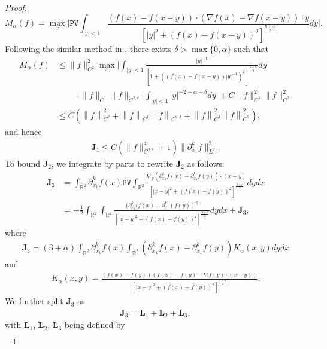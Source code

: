 \documentclass[reqno]{amsart}%
\theoremstyle{definition}
\theoremstyle{remark}
\numberwithin{equation}{section}
\newcommand{\0}{\mathbf{0}}
\newcommand{\1}{\mathbf{1}}
\newcommand{\R}{\mathbb R}
\newcommand{\PV}{\texttt{PV}}
\numberwithin{equation}{section}
\numberwithin{theorem}{section}
\numberwithin{figure}{section}
\begin{document}
\begin{proof}
\begin{equation}
M_\alpha(f) = \max_x\Big| \PV \int_{|y|<1}  \frac{\left(f(x)-f(x-y)\right)\cdot \left(\nabla f(x)-\nabla f(x-y)\right)\cdot y}{\left[ |y|^2 + \left(f(x) - f(x - y)\right)^2 \right]^{\frac{5 + \alpha}{2}}}dy\Big|.
\end{equation}
Following the similar method in \cite{CG07}, there exists $\delta>\max\{0,\alpha\}$ such that
\begin{align*}
M_\alpha(f)&\le \|f\|^2_{C^2}\max_{x}\Big|\int_{|y|<1}\frac{|y|^{-1}}{\left[ 1 + ((f(x) - f(x - y))|y|^{-1})^2 \right]^{\frac{5 + \alpha}{2}}}dy\Big|\\
&\qquad+\|f\|_{C^1}\|f\|_{C^{2,\delta}}\Big|\int_{|y|<1}|y|^{-2-\alpha+\delta}dy\Big|+C\|f\|^2_{C^1}\|f\|^2_{C^2}\\
&\le C( \left\|f\right\|_{C^2}^2 + \left\|f\right\|_{C^1}\left\|f\right\|_{C^{2,\delta}}   + \left\|f\right\|_{C^{1}}^2\left\|f\right\|_{C^2}^2),
\end{align*}
and hence
\begin{align*}
\mathbf{J}_1\le C(\|f\|^4_{C^{2,\delta}}+1)\|\partial^k_{x_1}f\|^2_{L^2}.
\end{align*}
To bound $\mathbf{J}_2$, we integrate by parts to rewrite $\mathbf{J}_2$ as follows:
\begin{align*}
\mathbf{J}_2&=\int_{\R^2}\partial_{x_1}^kf(x)\PV\int_{\R^2}\frac{\nabla_y(\partial_{x_1}^kf(x)-\partial_{x_1}^kf(y))\cdot(x-y)}{\left[ |x-y|^2 + \left(f(x) - f(y)\right)^2 \right]^{\frac{3 + \alpha}{2}}}dydx\\
&=-\frac{1}{2}\int_{\R^2}\int_{\R^2}\frac{(\partial_{x_1}^k(f(x)-\partial_{x_1}^k(f(y))^2}{\left[ |x-y|^2 + \left(f(x) - f(y)\right)^2 \right]^{\frac{3 + \alpha}{2}}}dydx+\mathbf{J}_3,
\end{align*}
where 
\begin{align*}
\mathbf{J}_3=(3+\alpha)\int_{\R^2}\partial_{x_1}^kf(x)\int_{\R^2}(\partial_{x_1}^kf(x)-\partial_{x_1}^kf(y))K_{\alpha}(x,y)dydx
\end{align*}
and
\begin{align*}
K_{\alpha}(x,y)=\frac{(f(x)-f(y))(f(x)-f(y)-\nabla f(y)\cdot(x-y))}{\left[ |x-y|^2 + \left(f(x) - f(y)\right)^2 \right]^{\frac{5 + \alpha}{2}}}.
\end{align*}
We further split $\mathbf{J}_3$ as 
\begin{align*}
\mathbf{J}_3=\mathbf{L}_1+\mathbf{L}_2+\mathbf{L}_3,
\end{align*}
with $\mathbf{L}_1$, $\mathbf{L}_2$, $\mathbf{L}_3$ being defined by
\begin{align*}

\end{align*}
\end{proof}
\end{document}
